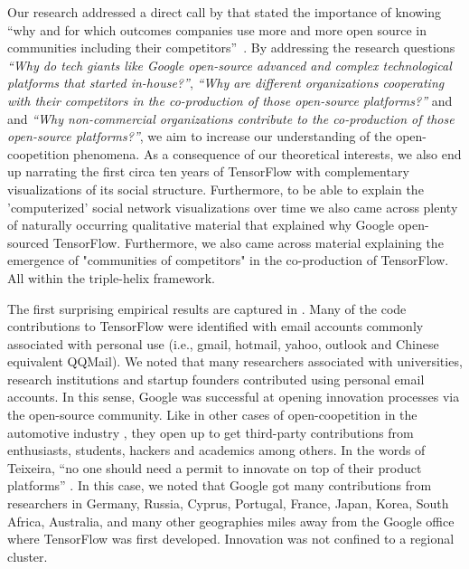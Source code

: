 \documentclass[CHICAGO,Times1COL]{WileyNJDv5} %
\begin{document}
Our research addressed a direct call by \citet{CzakonSrivastava_et_al2020} that stated the importance of knowing ``why and for which outcomes companies use more and more open source in communities including their competitors''~\citep[][]{CzakonSrivastava_et_al2020}.  By addressing the research questions \textit{``Why do tech giants like Google open-source advanced and complex technological platforms that started in-house?''},  \textit{``Why are different organizations cooperating with their competitors in the co-production of those open-source platforms?''} and and \textit{``Why non-commercial organizations contribute to the co-production of those open-source platforms?''}, we aim to increase our understanding of the open-coopetition phenomena. As a consequence of our theoretical interests, we also end up narrating the first circa ten years of TensorFlow with complementary visualizations of its social structure. Furthermore, to be able to explain the 'computerized' social network visualizations over time we also came across plenty of naturally occurring qualitative material that explained why Google open-sourced TensorFlow. Furthermore, we also came across material explaining the emergence of "communities of competitors"  in the co-production of TensorFlow.  All within the triple-helix framework. 



The first surprising empirical results are captured in . Many of the code contributions to TensorFlow were identified with email accounts commonly associated with personal use (i.e., gmail, hotmail, yahoo, outlook and Chinese equivalent QQMail). We noted that many researchers associated with universities, research institutions and startup founders contributed using personal email accounts. In this sense, Google was successful at opening innovation processes via the open-source community. Like in other cases of open-coopetition in the automotive industry \citep[see][]{teixeira2023icis}, they open up to get third-party contributions from enthusiasts, students, hackers and academics among others. In the words of Teixeira, ``no one should need a permit to innovate on top of their product platforms'' \citep[p.~6][]{teixeira2023icis}. In this case, we noted that Google got many contributions from researchers in Germany, Russia, Cyprus, Portugal, France, Japan, Korea, South Africa, Australia, and many other geographies miles away from the Google office where TensorFlow was first developed. Innovation was not confined to a regional cluster. 
\end{document}
